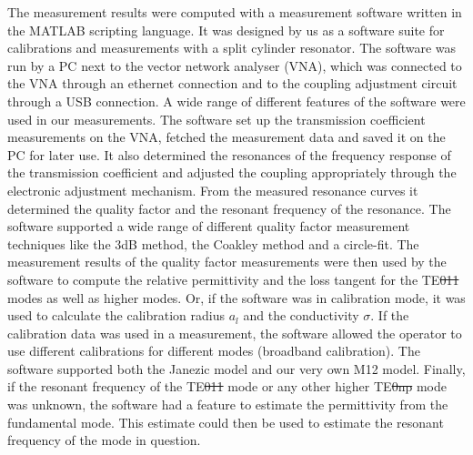The measurement results were computed with a measurement software written in the MATLAB scripting language. It was designed by us as a software suite for calibrations and measurements with a split cylinder resonator. The software was run by a PC next to the vector network analyser (VNA), which was connected to the VNA through an ethernet connection and to the coupling adjustment circuit through a USB connection. A wide range of different features of the software were used in our measurements. The software set up the transmission coefficient measurements on the VNA, fetched the measurement data and saved it on the PC for later use. It also determined the resonances of the frequency response of the transmission coefficient and adjusted the coupling appropriately through the electronic adjustment mechanism. From the measured resonance curves it determined the quality factor and the resonant frequency of the resonance. The software supported a wide range of different quality factor measurement techniques like the 3dB method, the Coakley method and a circle-fit. The measurement results of the quality factor measurements were then used by the software to compute the relative permittivity and the loss tangent for the TE\st{011} modes as well as higher modes. Or, if the software was in calibration mode, it was used to calculate the calibration radius $a_l$ and the conductivity $\sigma$. If the calibration data was used in a measurement, the software allowed the operator to use different calibrations for different modes (broadband calibration). The software supported both the Janezic model and our very own M12 model. Finally, if the resonant frequency of the TE\st{011} mode or any other higher TE\st{0np} mode was unknown, the software had a feature to estimate the permittivity from the fundamental mode. This estimate could then be used to estimate the resonant frequency of the mode in question.
